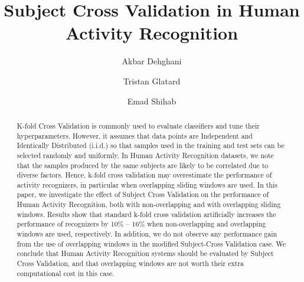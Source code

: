 \documentclass[sigconf]{acmart}
\begin{document}
%
\title{Subject Cross Validation in Human Activity Recognition}

%


\author{Akbar Dehghani}
 
\author{Tristan Glatard}

\author{Emad Shihab}


%
\begin{abstract}
K-fold Cross Validation is commonly used to evaluate classifiers
and tune their hyperparameters. However, it assumes that data points are Independent and Identically 
Distributed (i.i.d.) so that samples used in the training and test 
sets can be selected randomly and uniformly. In Human Activity Recognition datasets, 
we note that the samples produced by the same subjects are likely to be correlated due 
to diverse factors. Hence, 
k-fold cross validation may overestimate the performance of 
activity recognizers, in particular when overlapping sliding windows are used. 
In this paper, we investigate the effect of Subject 
Cross Validation on the performance of Human Activity Recognition, 
both with non-overlapping and with overlapping sliding windows. 
Results show that standard k-fold cross validation artificially 
increases the performance of recognizers by 10\% -- 16\% when non-overlapping and
overlapping windows are used, respectively. In addition, we do not observe any performance
gain from the use of overlapping windows in the modified Subject-Cross Validation case. We
conclude that Human Activity Recognition systems should be evaluated by Subject Cross
Validation, and that overlapping windows are not worth their extra computational cost in this case.
\end{abstract}
\end{document}
